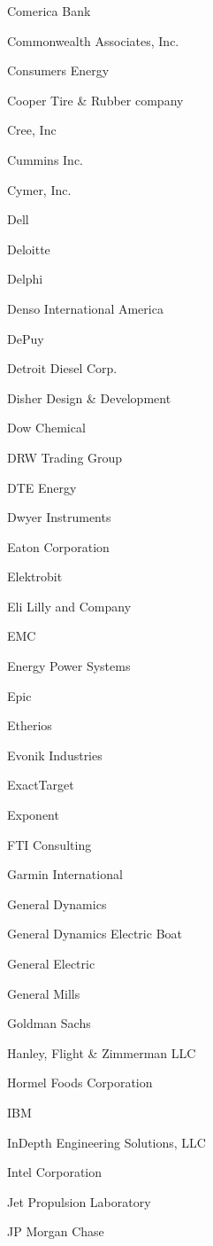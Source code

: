 \documentclass[twoside]{article}
\begin{document}
\begin{center}
\begin{multicols}{5}
\begin{FlushLeft}
\begin{compactitem}
\item Comerica Bank
\item Commonwealth Associates, Inc.
\item Consumers Energy
\item Cooper Tire \& Rubber company
\item Cree, Inc
\item Cummins Inc.
\item Cymer, Inc.
\item Dell
\item Deloitte
\item Delphi
\item Denso International America
\item DePuy
\item Detroit Diesel Corp.
\item Disher Design \& Development
\item Dow Chemical
\item DRW Trading Group
\item DTE Energy
\item Dwyer Instruments
\item Eaton Corporation
\item Elektrobit
\item Eli Lilly and Company
\item EMC
\item Energy Power Systems
\item Epic
\item Etherios
\item Evonik Industries
\item ExactTarget
\item Exponent
\item FTI Consulting
\item Garmin International
\item General Dynamics
\item General Dynamics Electric Boat
\item General Electric
\item General Mills
\item Goldman Sachs
\item Hanley, Flight \& Zimmerman LLC
\item Hormel Foods Corporation
\item IBM
\item InDepth Engineering Solutions, LLC
\item Intel Corporation
\item Jet Propulsion Laboratory
\item JP Morgan Chase

\end{compactitem}
\end{FlushLeft}
\end{multicols}
\end{center}
\end{document}
